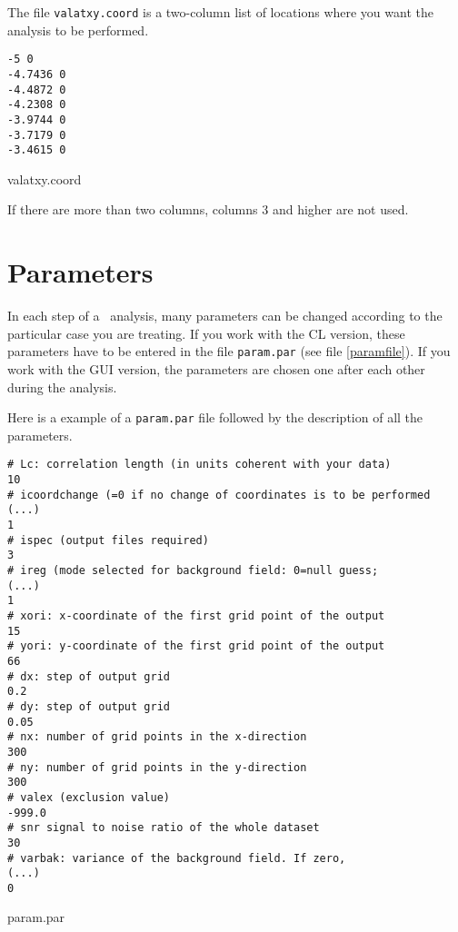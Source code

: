 The file \texttt{valatxy.coord} is a two-column list of locations where you want the analysis to be performed.  

\begin{exfile}[htpb]
\begin{footnotesize}
\texttt{-5 0\\
-4.7436 0\\
-4.4872 0\\
-4.2308 0\\
-3.9744 0\\
-3.7179 0\\
-3.4615 0} 
\end{footnotesize}
\caption{valatxy.coord\label{ex:valatxy}}
\end{exfile}

If there are more than two columns, columns 3 and higher are not used.

\section{Parameters\label{sec:param.par}}

In each step of a \diva\, analysis, many parameters can be changed according to the particular case you are treating. If you work with the CL version, these parameters have to be entered in the file \texttt{param.par} (see file \ref{paramfile}). If you work with the GUI version, the parameters are chosen one after each other during the analysis.

Here is a example of a \texttt{param.par} file followed by the description of all the parameters.

\begin{exfile}[htpb]
\begin{footnotesize}
\begin{verbatim}
# Lc: correlation length (in units coherent with your data)
10
# icoordchange (=0 if no change of coordinates is to be performed (...)
1
# ispec (output files required)
3
# ireg (mode selected for background field: 0=null guess;         (...)
1
# xori: x-coordinate of the first grid point of the output
15
# yori: y-coordinate of the first grid point of the output
66
# dx: step of output grid
0.2
# dy: step of output grid
0.05
# nx: number of grid points in the x-direction
300
# ny: number of grid points in the y-direction
300
# valex (exclusion value)
-999.0
# snr signal to noise ratio of the whole dataset
30
# varbak: variance of the background field. If zero,              (...)
0
\end{verbatim}
\end{footnotesize}
\caption{param.par\label{paramfile}}
\end{exfile}




